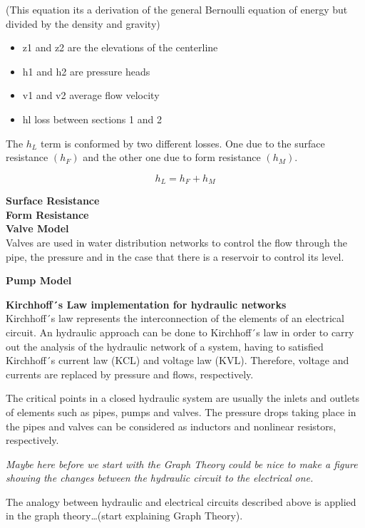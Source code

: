 (This equation its a derivation of the general Bernoulli equation of energy but divided by the density and 
gravity)\\

\begin{itemize}
  \item   z1 and z2 are the elevations of the centerline
  \item   h1 and h2 are pressure heads
  \item   v1 and v2 average flow velocity
  \item   hl loss between sections 1 and 2
\end{itemize}

The $h_L$ term is conformed by two different losses. One due to the surface resistance $(h_F)$ and the other one due to form resistance $(h_M)$. 

\begin{equation}
  h_L = h_F + h_M
\end{equation}

\textbf{Surface Resistance} \\ 

\textbf{Form Resistance} \\ 

\textbf{Valve Model}  \\
\label{ValveModel}
 Valves are used in water distribution networks to control the flow through the pipe, the pressure and in 
 the case that there is a reservoir to control its level. 
 
 \textbf{Pump Model} \\
 \label{PumpModel}
 
 \textbf{Kirchhoff´s Law implementation for hydraulic networks}\\
 \label{KirchhoffLaw}
 Kirchhoff´s law represents the interconnection of the elements of an electrical circuit. An hydraulic approach 
 can be done to Kirchhoff´s law in order to carry out the analysis of the hydraulic network of a system, having to satisfied Kirchhoff´s 
 current law (KCL) and voltage law (KVL). Therefore, voltage and currents are replaced by pressure and flows, respectively. 

The critical points in a closed hydraulic system are usually the inlets and outlets of elements such as pipes, pumps and valves. 
The pressure drops taking place in the pipes and valves can be considered as inductors and nonlinear resistors, respectively. 

\textit{Maybe here before we start with the Graph Theory could be nice to make a figure showing the changes between the hydraulic circuit to the electrical 
one.}

The analogy between hydraulic and electrical circuits described above is applied in the graph theory…(start explaining Graph Theory).









